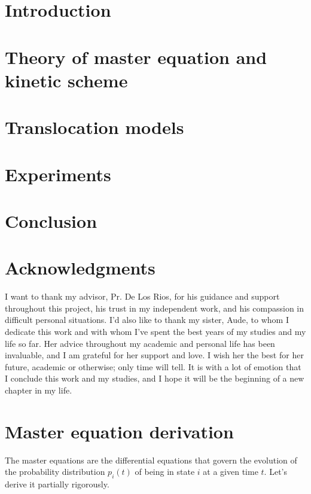 \documentclass{article}
\theoremstyle{remark}
\begin{document}


\tableofcontents
\pagebreak

\section{Introduction}
\label{sec:introduction}


\section{Theory of master equation and kinetic scheme}
\label{sec:theory}


\section{Translocation models}
\label{sec:models}


\section{Experiments}
\label{sec:experiments}


\section{Conclusion}
\label{sec:conclusion}


\section*{Acknowledgments}
    I want to thank my advisor, Pr. De Los Rios, for his guidance and support throughout this project, his trust in my independent work, and his compassion in difficult personal situations. I'd also like to thank my sister, Aude, to whom I dedicate this work and with whom I've spent the best years of my studies and my life so far. Her advice throughout my academic and personal life has been invaluable, and I am grateful for her support and love. I wish her the best for her future, academic or otherwise; only time will tell. It is with a lot of emotion that I conclude this work and my studies, and I hope it will be the beginning of a new chapter in my life.

\printbibliography

\appendix

\section{Master equation derivation}
\label{app:master-equation}
    The master equations are the differential equations that govern the evolution of the probability distribution $p_i(t)$ of being in state $i$ at a given time $t$. Let's derive it partially rigorously.
\end{document}
